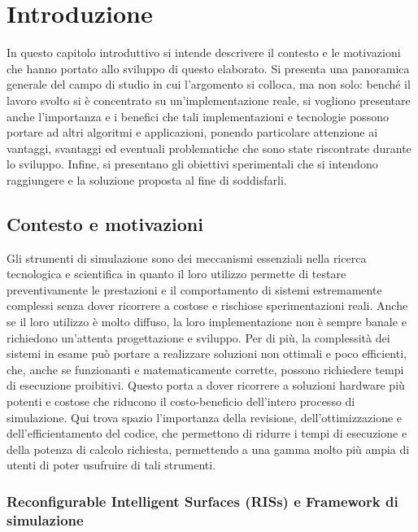 \chapter{Introduzione}
\label{ch:introduzione}

In questo capitolo introduttivo si intende descrivere il contesto e le
motivazioni che hanno portato allo sviluppo di questo elaborato. Si presenta una
panoramica generale del campo di studio in cui l'argomento si colloca, ma non
solo: benché il lavoro svolto si è concentrato su un'implementazione reale, si
vogliono presentare anche l'importanza e i benefici che tali implementazioni e
tecnologie possono portare ad altri algoritmi e applicazioni, ponendo particolare
attenzione ai vantaggi, svantaggi ed eventuali problematiche che sono state
riscontrate durante lo sviluppo. Infine, si presentano gli obiettivi
sperimentali che si intendono raggiungere e la soluzione proposta al fine di
soddisfarli.

\section{Contesto e motivazioni}
\label{sec:contesto}

Gli strumenti di simulazione sono dei meccanismi essenziali nella ricerca tecnologica
e scientifica in quanto il loro utilizzo permette di testare preventivamente le prestazioni
e il comportamento di sistemi estremamente complessi senza dover ricorrere a costose
e rischiose sperimentazioni reali. Anche se il loro utilizzo è molto diffuso, la
loro implementazione non è sempre banale e richiedono un'attenta progettazione e
sviluppo. Per di più, la complessità dei sistemi in esame può portare a realizzare
soluzioni non ottimali e poco efficienti, che, anche se funzionanti e matematicamente
corrette, possono richiedere tempi di esecuzione proibitivi. Questo porta a dover
ricorrere a soluzioni hardware più potenti e costose che riducono il costo-beneficio
dell'intero processo di simulazione. Qui trova spazio l'importanza della
revisione, dell'ottimizzazione e dell'efficientamento del codice, che permettono
di ridurre i tempi di esecuzione e della potenza di calcolo richiesta, permettendo
a una gamma molto più ampia di utenti di poter usufruire di tali strumenti.

\subsection{Reconfigurable Intelligent Surfaces (RISs) e Framework di
simulazione}
\label{subsec:risframework}

